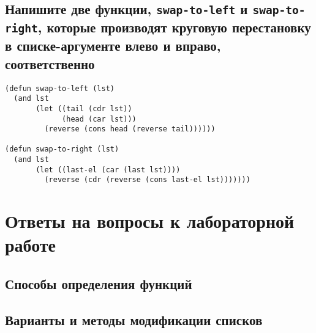 \section{Напишите две функции, \texttt{swap-to-left} и \texttt{swap-to-right}, которые производят круговую перестановку в списке-аргументе влево и вправо, соответственно}

\begin{lstlisting}
(defun swap-to-left (lst)
  (and lst
       (let ((tail (cdr lst))
             (head (car lst)))
         (reverse (cons head (reverse tail))))))

(defun swap-to-right (lst)
  (and lst
       (let ((last-el (car (last lst))))
         (reverse (cdr (reverse (cons last-el lst)))))))
\end{lstlisting}

\chapter{Ответы на вопросы к лабораторной работе}

\section{Способы определения функций}


\section{Варианты и методы модификации списков}

